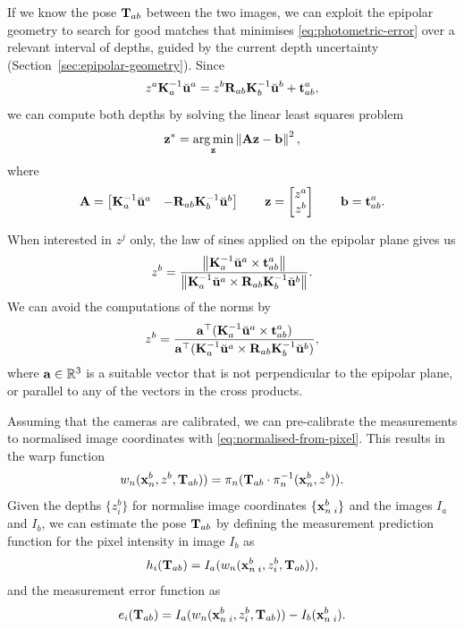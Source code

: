 If we know the pose ${\boldsymbol{\mathbf{T}}}_{ab}$ between the two images, we can exploit the epipolar geometry to search for good matches that minimises \eqref{eq:photometric-error} over a relevant interval of depths, guided by the current depth uncertainty (Section~\ref{sec:epipolar-geometry}).
Since
\begin{equation}
  z^a {\boldsymbol{\mathbf{K}}}^{-1}_a \breve{{\boldsymbol{\mathbf{u}}}}^a = z^b {\boldsymbol{\mathbf{R}}}_{ab} {\boldsymbol{\mathbf{K}}}^{-1}_b \breve{{\boldsymbol{\mathbf{u}}}}^b + {\boldsymbol{\mathbf{t}}}^a_{ab},
\end{equation}
we can compute both depths by solving the linear least squares problem
\begin{equation}
  {\boldsymbol{\mathbf{z}}}^\ast = \operatorname*{arg\,min}_{\boldsymbol{\mathbf{z}}} \left\lVert{\boldsymbol{\mathbf{A}}}{\boldsymbol{\mathbf{z}}} - {\boldsymbol{\mathbf{b}}}\right\rVert^2,
\end{equation}
where
\begin{equation}
  {\boldsymbol{\mathbf{A}}} = 
  \begin{bmatrix}
    {\boldsymbol{\mathbf{K}}}^{-1}_a \breve{{\boldsymbol{\mathbf{u}}}}^a & -{\boldsymbol{\mathbf{R}}}_{ab} {\boldsymbol{\mathbf{K}}}^{-1}_b \breve{{\boldsymbol{\mathbf{u}}}}^b
  \end{bmatrix}
  \qquad
  {\boldsymbol{\mathbf{z}}} = 
  \begin{bmatrix}
    z^a\\
    z^b
  \end{bmatrix}
  \qquad
  {\boldsymbol{\mathbf{b}}} = {\boldsymbol{\mathbf{t}}}^a_{ab}.
\end{equation}

When interested in $z^j$ only, the law of sines applied on the epipolar plane gives us
\begin{equation}
  z^b = \frac{\left\lVert{\boldsymbol{\mathbf{K}}}_a^{-1} \breve{{\boldsymbol{\mathbf{u}}}}^a \times {\boldsymbol{\mathbf{t}}}^a_{ab}\right\rVert} {\left\lVert{\boldsymbol{\mathbf{K}}}_a^{-1} \breve{{\boldsymbol{\mathbf{u}}}}^a \times {\boldsymbol{\mathbf{R}}}_{ab} {\boldsymbol{\mathbf{K}}}^{-1}_b \breve{{\boldsymbol{\mathbf{u}}}}^b\right\rVert}.
\end{equation}
We can avoid the computations of the norms by
\begin{equation}
  z^b = \frac{{\boldsymbol{\mathbf{a}}}^{\top} ({\boldsymbol{\mathbf{K}}}_a^{-1} \breve{{\boldsymbol{\mathbf{u}}}}^a \times {\boldsymbol{\mathbf{t}}}^a_{ab})} {{\boldsymbol{\mathbf{a}}}^{\top} ({\boldsymbol{\mathbf{K}}}_a^{-1} \breve{{\boldsymbol{\mathbf{u}}}}^a \times {\boldsymbol{\mathbf{R}}}_{ab} {\boldsymbol{\mathbf{K}}}^{-1}_b \breve{{\boldsymbol{\mathbf{u}}}}^b)},
\end{equation}
where ${\boldsymbol{\mathbf{a}}} \in {\mathbb R}^3$ is a suitable vector that is not perpendicular to the epipolar plane, or parallel to any of the vectors in the cross products.

Assuming that the cameras are calibrated, we can pre-calibrate the measurements to normalised image coordinates with \eqref{eq:normalised-from-pixel}.
This results in the warp function
\begin{equation}
  w_n({\boldsymbol{\mathbf{x}}}^b_n, z^b, {\boldsymbol{\mathbf{T}}}_{ab})) = \pi_n({\boldsymbol{\mathbf{T}}}_{ab} \cdot \pi_n^{-1}({\boldsymbol{\mathbf{x}}}^b_n, z^b)).
\end{equation}
Given the depths $\{z^b_i\}$ for normalise image coordinates $\{{\boldsymbol{\mathbf{x}}}^b_{n \; i}\}$ and the images $I_a$ and $I_b$, we can estimate the pose ${\boldsymbol{\mathbf{T}}}_{ab}$ by defining the measurement prediction function for the pixel intensity in image $I_b$ as
\begin{equation}
  h_i({\boldsymbol{\mathbf{T}}}_{ab}) = I_a(w_n({\boldsymbol{\mathbf{x}}}^b_{n \; i}, z^b_i, {\boldsymbol{\mathbf{T}}}_{ab})),
\end{equation}
and the measurement error function as
\begin{equation}
 e_i({\boldsymbol{\mathbf{T}}}_{ab}) = I_a(w_n({\boldsymbol{\mathbf{x}}}^b_{n \; i}, z^b_i, {\boldsymbol{\mathbf{T}}}_{ab})) - I_b({\boldsymbol{\mathbf{x}}}^b_{n \; i}).
\end{equation}

